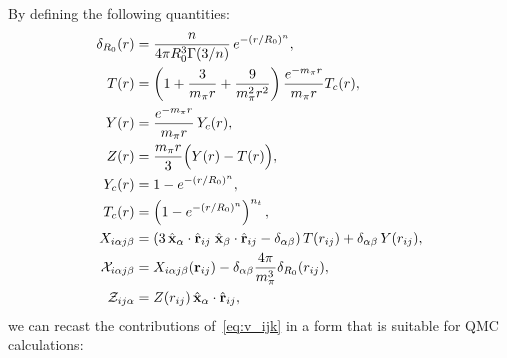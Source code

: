 \documentclass[aps,prc,twocolumn,superscriptaddress,floatfix]{revtex4-1}
\begin{document}
By defining the following quantities:
\begin{align}
\delta_{R_0}(r)&=\frac{n}{4\pi R_0^3\Gamma(3/n)}\,e^{-(r/R_0)^n}
\nonumber, \\
T(r)&=\left(1+\frac{3}{m_\pi r}+\frac{9}{m_\pi^2r^2}\right)\frac{e^{-m_\pi r}}{m_\pi r} T_c(r)
\nonumber, \\
Y(r)&=\frac{e^{-m_\pi r}}{m_\pi r}\,Y_c(r) 
\nonumber, \\
Z(r)&=\frac{m_\pi r}{3}\Big(Y(r)-T(r)\Big)
\nonumber, \\
Y_c(r)&=1-e^{-(r/R_0)^n}
\nonumber, \\
T_c(r)&=\left(1-e^{-(r/R_0)^n}\right)^{n_t}
\nonumber, \\
X_{i\alpha j\beta}&=(3\,\hat{\vb{x}}_\alpha\cdot\hat{\vb{r}}_{ij}\;\hat{\vb{x}}_\beta\cdot\hat{\vb{r}}_{ij}-\delta_{\alpha\beta})\,T(r_{ij})
+\delta_{\alpha\beta}\,Y(r_{ij}) 
\nonumber, \\
{\cal X}_{i\alpha j\beta}&=X_{i\alpha j\beta}(\vb{r}_{ij})-\delta_{\alpha\beta}\frac{4\pi}{m_\pi^3}\delta_{R_0}(r_{ij})
\nonumber, \\
{\cal Z}_{ij\alpha}&=Z(r_{ij})\,\hat{\vb{x}}_\alpha\cdot\hat{\vb{r}}_{ij},
\end{align}
we can recast the contributions of~\cref{eq:v_ijk} in a form that is suitable for QMC calculations:
\end{document}
